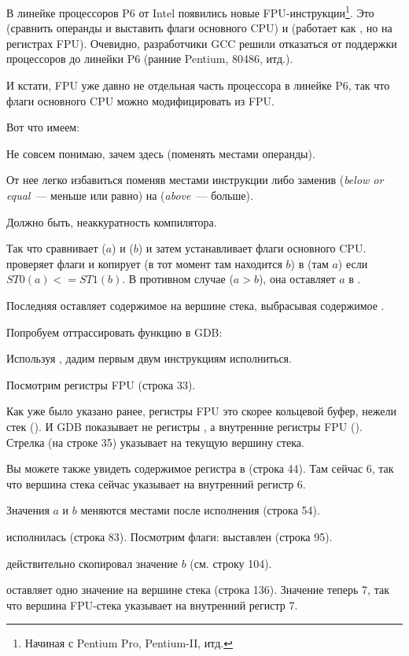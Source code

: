 \label{gcc481_o3}

В линейке процессоров P6 от Intel 
появились новые FPU-инструкции\footnote{Начиная с Pentium Pro, Pentium-II, итд.}.
Это  (сравнить операнды и выставить флаги основного CPU) и
 (работает как , но на регистрах FPU).
Очевидно, разработчики GCC решили отказаться от поддержки процессоров до линейки P6 (ранние Pentium, 80486, итд.).

И кстати, FPU уже давно не отдельная часть процессора в линейке P6, так что флаги основного CPU можно модифицировать из FPU.

Вот что имеем:



Не совсем понимаю, зачем здесь  (поменять местами операнды).

От нее легко избавиться поменяв местами инструкции \FLD либо заменив 
 (\emph{below or equal}~--- меньше или равно) на 
 (\emph{above}~--- больше).

Должно быть, неаккуратность компилятора.

Так что  сравнивает  ($a$) и  ($b$) 
и затем устанавливает флаги основного CPU.
 проверяет флаги и копирует  
(в тот момент там находится $b$) в 
 (там $a$) если $ST0 (a) <= ST1 (b)$.
В противном случае ($a>b$), она оставляет $a$ в .

Последняя \FSTP оставляет содержимое  на вершине стека, выбрасывая содержимое .

Попробуем оттрассировать функцию в GDB:



Используя , дадим первым двум инструкциям \FLD исполниться.

Посмотрим регистры FPU (строка 33).

Как уже было указано ранее, регистры FPU это скорее кольцевой буфер, нежели стек ().
И GDB показывает не регистры , а внутренние регистры FPU (). 
Стрелка (на строке 35) указывает на текущую вершину стека.

Вы можете также увидеть содержимое регистра  в  (строка 44). Там сейчас 6, так что
вершина стека сейчас указывает на внутренний регистр 6.

Значения $a$ и $b$ меняются местами после исполнения  (строка 54).

 исполнилась (строка 83).
Посмотрим флаги: \CF выставлен (строка 95).

 действительно скопировал значение $b$ (см. строку 104).

\FSTP оставляет одно значение на вершине стека (строка 136). 
Значение  теперь 7, так что вершина FPU-стека указывает на внутренний регистр 7.
